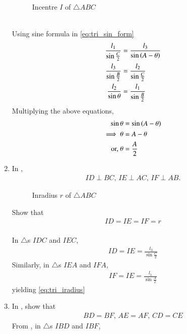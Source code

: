 \begin{enumerate}[label=\thesection.\arabic*.,ref=\thesection.\theenumi]
\begin{figure}[!ht]
\begin{center}
		\resizebox{0.6\columnwidth}{!}{}
	\end{center}
	\caption{Incentre $I$ of $\triangle ABC$}
	\label{fig:tri_icentre}	
\end{figure}
\\
\solution
Using sine formula
in
\eqref{eq:tri_sin_form}
  \begin{align}
  \frac{l_1}{\sin\frac{C}{2}}
  &= 
   \frac{l_3}{\sin \left(A-\theta\right)}
  \\
   \frac{l_3}{\sin\frac{B}{2}}
&=\frac{l_2}{\sin\frac{C}{2}}
  \\
\frac{l_2}{\sin \theta}
	  &=
  \frac{l_1}{\sin\frac{B}{2}}
  \end{align}
  Multiplying the above equations, 
  \begin{align}
  \sin \theta &= \sin \left(A - \theta\right)
  \\
	  \implies \theta &=A - \theta 
  \\
	  \text{or, } \theta &= \frac{A}{2}
  \end{align}
  \item In
	, 
  \begin{align}
	  ID \perp BC, \, 
	  IE \perp AC, \, 
	  IF \perp AB.
  \end{align}
		\begin{figure}[!ht]
	\begin{center}
		\resizebox{0.6\columnwidth}{!}{}
	\end{center}
	\caption{Inradius $r$ of $\triangle ABC$}
	\label{fig:tri_iradius}	
\end{figure}
  Show that 
  \begin{align}
	  ID=   
	  IE= 
	  IF=r 
	\label{eq:tri_iradius}	
  \end{align}
  \\
		\solution
In $\triangle$s $IDC$ and $IEC$, 
		\begin{align}
ID = IE=  \frac{l_3}{\sin\frac{C}{2}}
		\end{align}
		Similarly, 
in $\triangle$s $IEA$ and $IFA$, 
		\begin{align}
IF = IE=  \frac{l_1}{\sin\frac{A}{2}}
		\end{align}
		yielding 
	\eqref{eq:tri_iradius}	
  \item In
	, show that
  \begin{align}
	  BD=BF ,\, 
	  AE=AF ,\, 
	  CD=CE 
  \end{align}
  \solution  From 
, in $\triangle$s $IBD$ and $IBF$, 

\end{enumerate}
